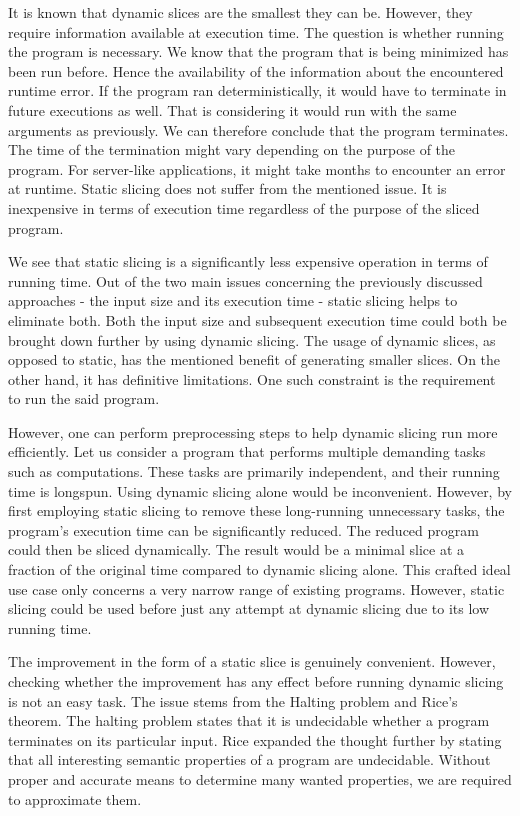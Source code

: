 It is known that dynamic slices are the smallest they can be. 
However, they require information available at execution time. 
The question is whether running the program is necessary. 
We know that the program that is being minimized has been run before. 
Hence the availability of the information about the encountered runtime 
error. 
If the program ran deterministically, it would have to terminate in future 
executions as well.  
That is considering it would run with the same arguments as previously.  
We can therefore conclude that the program terminates.  
The time of the termination might vary depending on the purpose of 
the program.  
For server-like applications, it might take months to encounter an error 
at runtime. 
Static slicing does not suffer from the mentioned issue.  
It is inexpensive in terms of execution time regardless of the purpose of 
the sliced program. 

We see that static slicing is a significantly less expensive operation in 
terms of running time. 
Out of the two main issues concerning the previously discussed 
approaches - the input size and its execution time - static slicing helps to 
eliminate both. 
Both the input size and subsequent execution time could both be brought down 
further by using dynamic slicing.  
The usage of dynamic slices, as opposed to static, has the mentioned benefit 
of generating smaller slices.
On the other hand, it has definitive limitations. 
One such constraint is the requirement to run the said program. 

However, one can perform preprocessing steps to help dynamic slicing run more 
efficiently.  
Let us consider a program that performs multiple demanding tasks such as 
computations.  
These tasks are primarily independent, and their running time is longspun.  
Using dynamic slicing alone would be inconvenient.  
However, by first employing static slicing to remove these long-running 
unnecessary tasks, the program's execution time can be significantly reduced.  
The reduced program could then be sliced dynamically.  
The result would be a minimal slice at a fraction of the original time 
compared to dynamic slicing alone. 
This crafted ideal use case only concerns a very narrow range of existing 
programs.  
However, static slicing could be used before just any attempt at dynamic 
slicing due to its low running time. 


The improvement in the form of a static slice is genuinely convenient.  
However, checking whether the improvement has any effect before running 
dynamic slicing is not an easy task.  
The issue stems from the Halting problem and Rice's theorem.  
The halting problem states that it is undecidable whether a program 
terminates on its particular input.  
Rice expanded the thought further by stating that all interesting semantic 
properties of a program are undecidable. 
Without proper and accurate means to determine many wanted properties, we 
are required to approximate them. 

